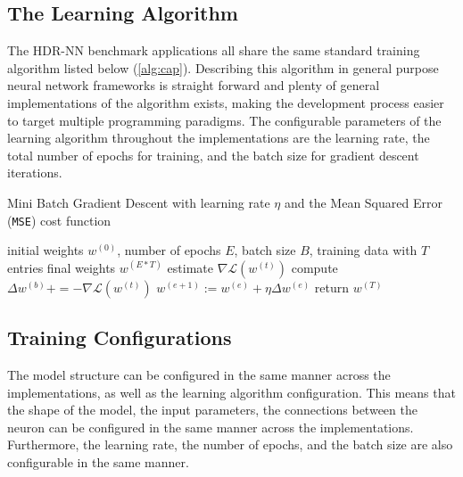\subsection{The Learning Algorithm}

The HDR-NN benchmark applications all share the same standard training algorithm listed below (\ref{alg:cap}). Describing this algorithm in general purpose neural network frameworks is straight forward and plenty of general implementations of the algorithm exists, making the development process easier to target multiple programming paradigms. The configurable parameters of the learning algorithm throughout the implementations are the learning rate, the total number of epochs for training, and the batch size for gradient descent iterations.

\begin{algorithm}[h]
	\caption{Mini Batch Gradient Descent with learning rate $\eta$ and the Mean Squared Error (\texttt{MSE}) cost function}
	\label{alg:cap}
	\begin{algorithmic}
	\Require initial weights $w^{(0)}$, number of epochs $E$, batch size $B$, training data with $T$ entries
	\Ensure final weights $w^{(E*T)}$
			\State estimate $\nabla \mathcal{L}(w^{(t)})$ 
			\State compute $\Delta w^{(b)} += - \nabla \mathcal{L}(w^{(t)})$\label{lin:deep-learning-delta-w}
			\EndFor
			\State $w^{(e + 1)} := w^{(e)} + \eta \Delta w^{(e)}$
		\EndFor
	\EndFor
	\State return $w^{(T)}$
	\end{algorithmic}
\end{algorithm}


\subsection{Training Configurations}

The model structure can be configured in the same manner across the implementations, as well as the learning algorithm configuration. This means that the shape of the model, the input parameters, the connections between the neuron can be configured in the same manner across the implementations. Furthermore, the learning rate, the number of epochs, and the batch size are also configurable in the same manner.

